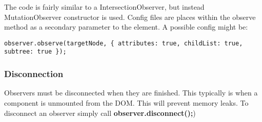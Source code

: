 \documentclass[portfolio.tex]{subfiles}
\begin{document}
				The code is fairly similar to a IntersectionObserver, but instead MutationObserver constructor is used. Config files are places within the observe method as a secondary parameter to the element. A possible config might be: \\

				\begin{lstlisting}
observer.observe(targetNode, { attributes: true, childList: true, subtree: true });
				\end{lstlisting}

			\autocite{mutation-observer}

			\subsubsection{Disconnection}
				Observers must be disconnected when they are finished. This typically is when a component is unmounted from the DOM. This will prevent memory leaks. To disconnect an observer simply call \textbf{observer.disconnect();})
\end{document}
